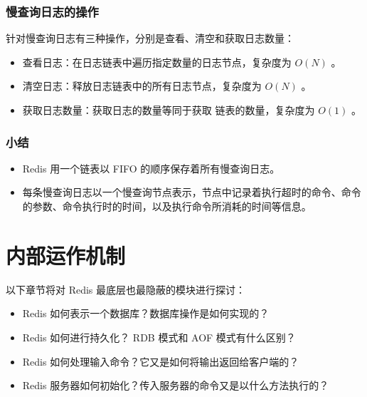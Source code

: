 \documentclass[a4paper,11pt,english]{sphinxmanual}
\begin{document}
\subsection{慢查询日志的操作}
\label{feature/slowlog:id4}
针对慢查询日志有三种操作，分别是查看、清空和获取日志数量：
\begin{itemize}
\item {} 
查看日志：在日志链表中遍历指定数量的日志节点，复杂度为 $O(N)$ 。

\item {} 
清空日志：释放日志链表中的所有日志节点，复杂度为 $O(N)$ 。

\item {} 
获取日志数量：获取日志的数量等同于获取  链表的数量，复杂度为 $O(1)$ 。

\end{itemize}


\subsection{小结}
\label{feature/slowlog:id5}\begin{itemize}
\item {} 
Redis 用一个链表以 FIFO 的顺序保存着所有慢查询日志。

\item {} 
每条慢查询日志以一个慢查询节点表示，节点中记录着执行超时的命令、命令的参数、命令执行时的时间，以及执行命令所消耗的时间等信息。

\end{itemize}


\chapter{内部运作机制}
\label{index:id5}
以下章节将对 Redis 最底层也最隐蔽的模块进行探讨：
\begin{itemize}
\item {} 
Redis 如何表示一个数据库？数据库操作是如何实现的？

\item {} 
Redis 如何进行持久化？ RDB 模式和 AOF 模式有什么区别？

\item {} 
Redis 如何处理输入命令？它又是如何将输出返回给客户端的？

\item {} 
Redis 服务器如何初始化？传入服务器的命令又是以什么方法执行的？

\end{itemize}
\end{document}
